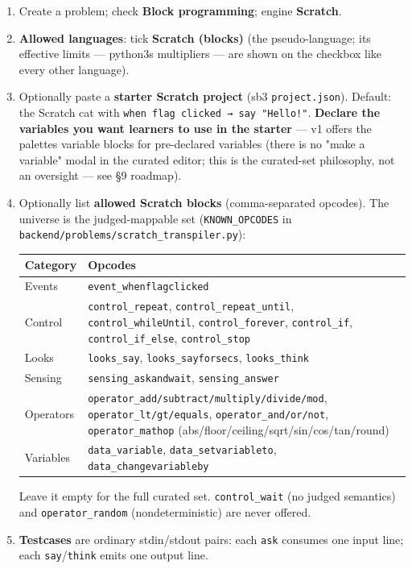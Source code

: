 \documentclass[
]{article}
\newcounter{none} %
\begin{document}
\begin{enumerate}
\def\labelenumi{\arabic{enumi}.}
\item
  Create a problem; check \textbf{Block programming}; engine
  \textbf{Scratch}.
\item
  \textbf{Allowed languages}: tick \textbf{Scratch (blocks)} (the
  pseudo-language; its effective limits --- python3\textquotesingle s
  multipliers --- are shown on the checkbox like every other language).
\item
  Optionally paste a \textbf{starter Scratch project} (sb3
  \texttt{project.json}). Default: the Scratch cat with
  \texttt{when\ flag\ clicked\ →\ say\ "Hello!"}. \textbf{Declare the
  variables you want learners to use in the starter} --- v1 offers the
  palette\textquotesingle s variable blocks for pre-declared variables
  (there is no "make a variable" modal in the curated editor; this is
  the curated-set philosophy, not an oversight --- see §9 roadmap).
\item
  Optionally list \textbf{allowed Scratch blocks} (comma-separated
  opcodes). The universe is the judged-mappable set
  (\texttt{KNOWN\_OPCODES} in
  \texttt{backend/problems/scratch\_transpiler.py}):

  {\def\LTcaptype{none} %
  \begin{longtable}[]{@{}ll@{}}
  \toprule\noalign{}
  Category & Opcodes \\
  \midrule\noalign{}
  \endhead
  \bottomrule\noalign{}
  \endlastfoot
  Events & \texttt{event\_whenflagclicked} \\
  Control & \texttt{control\_repeat}, \texttt{control\_repeat\_until},
  \texttt{control\_whileUntil}, \texttt{control\_forever},
  \texttt{control\_if}, \texttt{control\_if\_else},
  \texttt{control\_stop} \\
  Looks & \texttt{looks\_say}, \texttt{looks\_sayforsecs},
  \texttt{looks\_think} \\
  Sensing & \texttt{sensing\_askandwait}, \texttt{sensing\_answer} \\
  Operators & \texttt{operator\_add/subtract/multiply/divide/mod},
  \texttt{operator\_lt/gt/equals}, \texttt{operator\_and/or/not},
  \texttt{operator\_mathop}
  (abs/floor/ceiling/sqrt/sin/cos/tan/round) \\
  Variables & \texttt{data\_variable}, \texttt{data\_setvariableto},
  \texttt{data\_changevariableby} \\
  \end{longtable}
  }

  Leave it empty for the full curated set. \texttt{control\_wait} (no
  judged semantics) and \texttt{operator\_random} (nondeterministic) are
  never offered.
\item
  \textbf{Testcases} are ordinary stdin/stdout pairs: each \texttt{ask}
  consumes one input line; each \texttt{say}/\texttt{think} emits one
  output line.
\end{enumerate}
\end{document}
